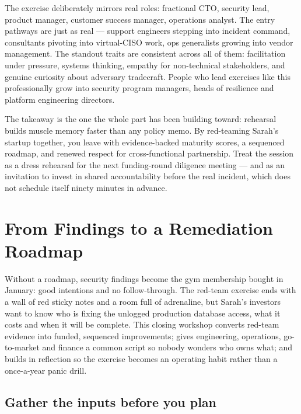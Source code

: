 The exercise deliberately mirrors real roles: fractional CTO, security lead, product manager, customer success manager, operations analyst. The entry pathways are just as real — support engineers stepping into incident command, consultants pivoting into virtual-CISO work, ops generalists growing into vendor management. The standout traits are consistent across all of them: facilitation under pressure, systems thinking, empathy for non-technical stakeholders, and genuine curiosity about adversary tradecraft. People who lead exercises like this professionally grow into security program managers, heads of resilience and platform engineering directors.


The takeaway is the one the whole part has been building toward: rehearsal builds muscle memory faster than any policy memo. By red-teaming Sarah's startup together, you leave with evidence-backed maturity scores, a sequenced roadmap, and renewed respect for cross-functional partnership. Treat the session as a dress rehearsal for the next funding-round diligence meeting — and as an invitation to invest in shared accountability before the real incident, which does not schedule itself ninety minutes in advance.

\section{From Findings to a Remediation Roadmap}
Without a roadmap, security findings become the gym membership bought in January: good intentions and no follow-through. The red-team exercise ends with a wall of red sticky notes and a room full of adrenaline, but Sarah's investors want to know who is fixing the unlogged production database access, what it costs and when it will be complete. This closing workshop converts red-team evidence into funded, sequenced improvements; gives engineering, operations, go-to-market and finance a common script so nobody wonders who owns what; and builds in reflection so the exercise becomes an operating habit rather than a once-a-year panic drill.



\subsection{Gather the inputs before you plan}


